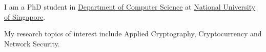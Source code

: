 

\begin{cvparagraph}

I am a PhD student in \href{http://www.comp.nus.edu.sg/about/depts/cs/}{Department of Computer Science} at \href{http://nus.edu.sg/}{National University of Singapore}.

My research topics of interest include Applied Cryptography, Cryptocurrency and Network Security.

\end{cvparagraph}
